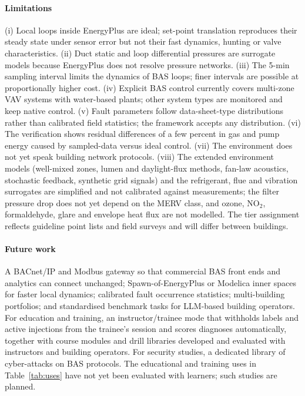 \documentclass[preprint,12pt,authoryear=false]{elsarticle}
\begin{document}
\paragraph{Limitations} (i) Local loops inside EnergyPlus are ideal; set-point translation reproduces their steady
state under sensor error but not their fast dynamics, hunting or valve characteristics. (ii) Duct static and loop
differential pressures are surrogate models because EnergyPlus does not resolve pressure networks. (iii) The 5-min
sampling interval limits the dynamics of BAS loops; finer intervals are possible at proportionally higher cost.
(iv) Explicit BAS control currently covers multi-zone VAV systems with water-based plants; other system types are
monitored and keep native control. (v) Fault parameters follow data-sheet-type distributions rather than calibrated
field statistics; the framework accepts any distribution. (vi) The verification shows residual differences of a few
percent in gas and pump energy caused by sampled-data versus ideal control. (vii) The environment does not yet speak
building network protocols. (viii) The extended environment models (well-mixed zones, lumen and daylight-flux
methods, fan-law acoustics, stochastic feedback, synthetic grid signals) and the refrigerant, flue and vibration
surrogates are simplified and not calibrated against measurements; the filter pressure drop does not yet depend on
the MERV class, and ozone, NO$_2$, formaldehyde, glare and envelope heat flux are not modelled. The tier assignment
reflects guideline point lists and field surveys and will differ between buildings.

\paragraph{Future work} A BACnet/IP and Modbus gateway so that commercial BAS front ends and analytics can connect
unchanged; Spawn-of-EnergyPlus or Modelica inner spaces for faster local dynamics; calibrated fault occurrence
statistics; multi-building portfolios; and standardised benchmark tasks for LLM-based building operators. For
education and training, an instructor/trainee mode that withholds labels and active injections from the trainee's
session and scores diagnoses automatically, together with course modules and drill libraries developed and evaluated
with instructors and building operators. For security studies, a dedicated library of cyber-attacks on BAS
protocols. The educational and training uses in Table~\ref{tab:uses} have not yet been evaluated with learners; such
studies are planned.
\end{document}
